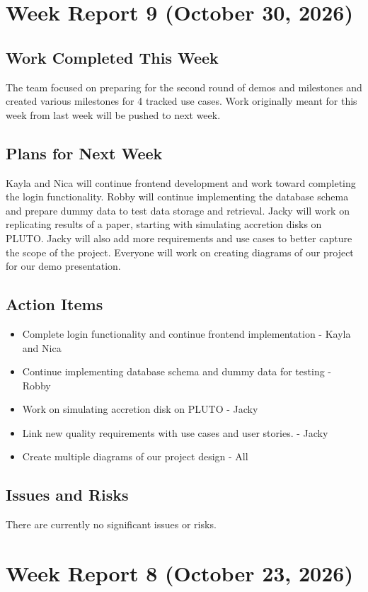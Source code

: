 \section{Week Report 9 (October 30, 2026)}
\subsection{Work Completed This Week}
The team focused on preparing for the second round of demos and milestones and created various milestones for 4 tracked use cases. Work originally meant for this week from last week will be pushed to next week. 

\subsection{Plans for Next Week}
Kayla and Nica will continue frontend development and work toward completing the login functionality. Robby will continue implementing the database schema and prepare dummy data to test data storage and retrieval. Jacky will work on replicating results of a paper, starting with simulating accretion disks on PLUTO. Jacky will also add more requirements and use cases to better capture the scope of the project. Everyone will work on creating diagrams of our project for our demo presentation.

\subsection{Action Items}
\begin{itemize}
    \item Complete login functionality and continue frontend implementation - Kayla and Nica
    \item Continue implementing database schema and dummy data for testing - Robby
    \item Work on simulating accretion disk on PLUTO - Jacky
    \item Link new quality requirements with use cases and user stories. - Jacky
    \item Create multiple diagrams of our project design - All
\end{itemize}

\subsection{Issues and Risks}
There are currently no significant issues or risks.


\section{Week Report 8 (October 23, 2026)}

